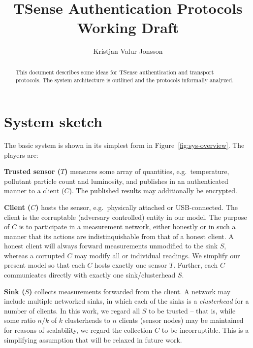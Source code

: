 \documentclass[10pt,a4paper]{article}
\author{Kristjan Valur Jonsson}
\title{TSense Authentication Protocols\\Working Draft}
\begin{document}
\maketitle

\begin{abstract}
This document describes some ideas for TSense authentication and transport protocols. The system architecture is outlined and the protocols informally analyzed.
\end{abstract}


\section{System sketch}

The basic system is shown in its simplest form in Figure~\ref{fig:sys-overview}. The players are:
\begin{description}
\item \textbf{Trusted sensor ($T$)} measures some array of quantities, e.g.\ temperature, pollutant particle count and luminosity, and publishes in an authenticated manner to a client ($C$). The published results may additionally be encrypted.
\item \textbf{Client ($C$)} hosts the sensor, e.g.\ physically attached or USB-connected. The client is the corruptable (adversary controlled) entity in our model. The purpose of $C$ is to participate in a measurement network, either honestly or in such a manner that its actions are indistinquishable from that of a honest client. A honest client will always forward measurements unmodified to the sink $S$, whereas a corrupted $C$ may modify all or individual readings. We simplify our present model so that each $C$ hosts exactly one sensor $T$. Further, each $C$ communicates directly with exactly one sink/clusterhead $S$.
\item \textbf{Sink ($S$)} collects measurements forwarded from the client. A network may include multiple networked sinks, in which each of the sinks is a \textit{clusterhead} for a number of clients. In this work, we regard all $S$ to be trusted -- that is, while some ratio $n/k$ of $k$ clusterheads to $n$ clients (sensor nodes) may be maintained for reasons of scalability, we regard the collection $C$ to be incorruptible. This is a simplifying assumption that will be relaxed in future work.

\end{description}
\end{document}
